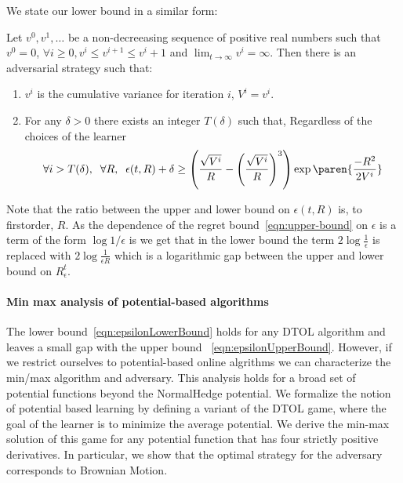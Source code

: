 \documentclass{article}[12pt]
\begin{document}
We state our lower bound in a similar form:
\begin{theorem} \label{thm:LowerBound} Let $v^0,v^1,\ldots$ be a
  non-decreeasing sequence of positive real numbers such that $v^0=0$,
  $\forall i \geq 0, v^i\leq v^{i+1} \leq v^i+1$ and
  $\lim_{t \to \infty} v^i = \infty$.  Then there is an adversarial
  strategy such that:
  \begin{enumerate}
  \item $v^i$ is the cumulative variance for iteration $i$,  $V^i=v^i$.
  \item For any $\delta>0$ there exists an integer $T(\delta)$ such
    that, Regardless of the choices of the learner
  \begin{equation} \label{eqn:epsilonLowerBound}
    \forall i > T(\delta),\;\;\forall R,\;\; \epsilon(t,R) +\delta \geq
    \left(\frac{\sqrt{V^i}}{\R} -  \left( \frac{\sqrt{V^i}}{\R} \right)^3 \right) \exp \paren{\frac{-R^2}{2V^i}}
  \end{equation}
  \end{enumerate}
\end{theorem}

Note that the ratio between the upper and lower bound on
$\epsilon(t,R)$ is, to firstorder, $R$. As the dependence of the
regret bound~\ref{eqn:upper-bound} on $\epsilon$ is a term of the form
$\log 1/\epsilon$ is we get that in the lower bound the term
$2\log \frac{1}{\epsilon}$ is replaced with
$2 \log \frac{1}{\epsilon R}$ which is a logarithmic gap between the
upper and lower bound on $R^t_\epsilon$.

\paragraph{Min max analysis of potential-based algorithms}
The lower bound~\ref{eqn:epsilonLowerBound} holds for any DTOL
algorithm and leaves a small gap with the upper bound
~\ref{eqn:epsilonUpperBound}. However, if we restrict ourselves to
potential-based online algrithms we can characterize the min/max
algorithm and adversary. This analysis holds for a broad set of
potential functions beyond the NormalHedge potential.  We formalize
the notion of potential based learning by defining a variant of the
DTOL game, where the goal of the learner is to minimize the average
potential. We derive the min-max solution of this game for any
potential function that has four strictly positive derivatives. In
particular, we show that the optimal strategy for the adversary
corresponds to Brownian Motion.
\end{document}
